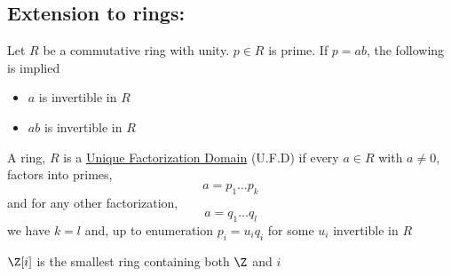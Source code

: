 \documentclass[../notes.tex]{subfiles}
\begin{document}
\subsection{Extension to rings:} Let $R$ be a commutative ring with unity. 
$p\in R$ is prime. If $p=ab$, the following is implied
\begin{itemize}
    \item $a$ is invertible in $R$
    \item $ab$ is invertible in $R$
\end{itemize}
\begin{definition}
    A ring, $R$ is a \underline{Unique Factorization Domain} (U.F.D) if
    every $a\in R$ with $a\neq 0$, factors into primes,
    \[
        a=p_1\dots p_k
    \]
    and for any other  factorization,
    \[
        a=q_1\dots q_l
    \]
    we have $k=l$ and, up to enumeration $p_i=u_iq_i$ for some $u_i$ invertible in
    $R$
\end{definition}
\begin{definition}
    $\Z[i]$ is the smallest ring containing both $\Z$ and $i$
\end{definition}
\end{document}
